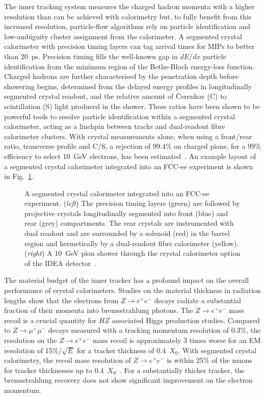 The inner tracking system measures the charged hadron momenta with a higher resolution than can be achieved with calorimetry but, to fully benefit from this increased resolution, particle-flow algorithms rely on particle identification and low-ambiguity cluster assignment from the calorimeter.  A segmented crystal calorimeter with precision timing layers can tag arrival times for MIPs to better than 20~ps.  Precision timing fills the well-known gap in $dE/dx$ particle identification from the minimum region of the Bethe-Bloch energy-loss function.  Charged hadrons are further characterised by the penetration depth before showering begins, determined from the delayed energy profiles in longitudinally segmented crystal readout, and the relative amount of \v{C}erenkov (C) to scintillation (S) light produced in the shower.  These ratios have been shown to be powerful tools to resolve particle identification within a segmented crystal calorimeter, acting as a linchpin between tracks and dual-readout fibre calorimeter clusters.  With crystal measurements alone, when using a front/rear ratio, transverse profile and C/S, a rejection of 99.4\% on charged pions, for a 99\% efficiency to select 10~GeV electrons, has been estimated~\cite{Lucchini_2020}.  An example layout of a segmented crystal calorimeter integrated into an FCC-ee experiment is shown in Fig.~\ref{fig:calo-crystals}.

\begin{figure}[ht]
\centering
{}
\caption{A segmented crystal calorimeter integrated into an FCC-ee experiment.  ({\it left}) The precision timing layers (green) are followed by projective crystals longitudinally segmented into front (blue) and rear (grey) compartments.  The rear crystals are instrumented with dual readout and are surrounded by a solenoid (red) in the barrel region and hermetically by a dual-readout fibre calorimeter (yellow).  ({\it right}) A 10~GeV pion shower through the crystal calorimeter option of the IDEA detector~\cite{ALY2020162088}.}\label{fig:calo-crystals}
\end{figure}

The material budget of the inner tracker has a profound impact on the overall performance of crystal calorimeters.  Studies on the material thickness in radiation lengths show that the electrons from $Z\rightarrow e^+e^-$ decays radiate a substantial fraction of their momenta into bremsstrahlung photons.  The $Z\rightarrow e^+e^-$ mass recoil is a crucial quantity for $HZ$ associated Higgs production studies.  Compared to $Z\rightarrow \mu^+\mu^-$ decays measured with a tracking momentum resolution of 0.3\%, the resolution on the $Z\rightarrow e^+e^-$ mass recoil is approximately 3 times worse for an EM resolution of 15\%/$\sqrt{E}$ for a tracker thickness of 0.4~$X_0$.
With segmented crystal calorimetry, the recoil mass resolution of $Z\rightarrow e^+e^-$ is within 25\% of the muons for tracker thicknesses up to 0.4~$X_0$~\cite{Lucchini_2020}. For a substantially thicker tracker, the bremsstrahlung recovery does not show significant improvement on the electron momentum.


